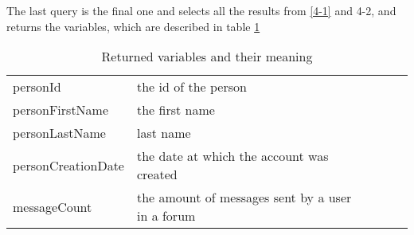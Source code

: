 The last query is the final one and selects all the results from \ref{4-1} and {4-2}, and returns the variables, which are described in table \ref{RetCypher4BITable}


\begin{table}[!ht]
\begin{tabular}{|l|l|lll}
\cline{1-2}
personId           & the id of the person                             &  &  &  \\ \cline{1-2}
personFirstName    & the first name                                   &  &  &  \\ \cline{1-2}
personLastName     & last name                                        &  &  &  \\ \cline{1-2}
personCreationDate & the date at which the account was created        &  &  &  \\ \cline{1-2}
messageCount       & the amount of messages sent by a user in a forum &  &  &  \\ \cline{1-2}
\end{tabular}
\caption{Returned variables and their meaning}
\label{RetCypher4BITable}
\end{table}